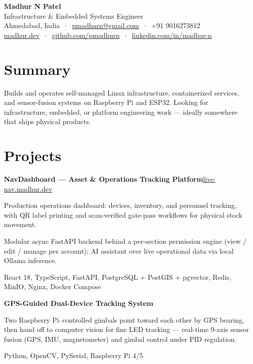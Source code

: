 \documentclass[10pt,a4paper]{article}
\newcommand{\entry}[2]{%
  \textbf{#1}\hfill{\small #2}\par\vspace{0.12em}}
\newcommand{\stack}[1]{{\small\color{subtle}#1}}
\begin{document}
\begin{center}
  {\Huge\bfseries Madhur N Patel}\\[0.3em]
  {\large\color{subtle} Infrastructure \& Embedded Systems Engineer}\\[0.3em]
  {\small
    Ahmedabad, India \,·\,
    \href{mailto:pmadhurn@gmail.com}{pmadhurn@gmail.com} \,·\,
    +91 9016273812\\[0.15em]
    \href{https://madhur.dev}{madhur.dev} \,·\,
    \href{https://github.com/pmadhurn}{github.com/pmadhurn} \,·\,
    \href{https://linkedin.com/in/madhur-n}{linkedin.com/in/madhur-n}
  }
\end{center}

\vspace{-0.3em}

\section{Summary}
Builds and operates self-managed Linux infrastructure, containerized services, and
sensor-fusion systems on Raspberry Pi and ESP32. Looking for infrastructure, embedded,
or platform engineering work — ideally somewhere that ships physical products.

\section{Projects}

\entry{NavDashboard — Asset \& Operations Tracking Platform}{\href{https://nav.madhur.dev}{live: nav.madhur.dev}}
\begin{tight}
  \item Production operations dashboard: devices, inventory, and personnel tracking, with
        QR label printing and scan-verified gate-pass workflows for physical stock movement.
  \item Modular async FastAPI backend behind a per-section permission engine
        (view / edit / manage per account); AI assistant over live operational data via
        local Ollama inference.
  \item \stack{React 18, TypeScript, FastAPI, PostgreSQL + PostGIS + pgvector, Redis,
        MinIO, Nginx, Docker Compose}
\end{tight}

\vspace{0.3em}
\entry{GPS-Guided Dual-Device Tracking System}{}
\begin{tight}
  \item Two Raspberry Pi–controlled gimbals point toward each other by GPS bearing, then
        hand off to computer vision for fine LED tracking — real-time 9-axis sensor fusion
        (GPS, IMU, magnetometer) and gimbal control under PID regulation.
  \item \stack{Python, OpenCV, PySerial, Raspberry Pi 4/5}
\end{tight}
\end{document}
